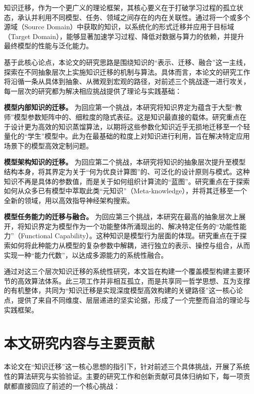 \documentclass[../main.tex]{subfiles}
\begin{document}
知识迁移，作为一个更广义的理论框架，其核心要义在于打破学习过程的孤立状态，承认并利用不同模型、任务、领域之间存在的内在关联性。通过将一个或多个源域（Source Domain）中获取的知识，以系统化的形式迁移并应用于目标域（Target Domain），能够显著加速学习过程、降低对数据与算力的依赖，并提升最终模型的性能与泛化能力。

基于此核心论点，本论文的研究思路是围绕知识的“表示、迁移、融合”这一主线，探索在不同抽象层次上实施知识迁移的机制与算法。具体而言，本论文的研究工作将沿循一条从具体到抽象、从微观到宏观的路径，对前述三个挑战逐一进行攻关，每一层次的研究都为解决相应挑战提供了理论与实践基础：

\textbf{ 模型内部知识的迁移。} 为回应第一个挑战，本研究将知识界定为蕴含于大型“教师”模型参数矩阵中的、细粒度的隐式表征。这是知识最直接的载体。研究重点在于设计更为高效的知识蒸馏算法，以期将这些参数化知识近乎无损地迁移至一个轻量化的“学生”模型中。此为在最基础的粒度上对知识进行利用，旨在解决特定应用场景下的模型高效定制问题。

\textbf{ 模型架构知识的迁移。} 为回应第二个挑战，本研究将知识的抽象层次提升至模型结构本身，将其界定为关于“何为优良计算图”的、可泛化的设计原则与模式。这种知识不再是具体的参数值，而是关于如何组织计算流的“蓝图”。研究重点在于探索如何从众多已有模型中萃取此类“元知识”（Meta-knowledge），并将其迁移至一个全新的领域，用以高效指导神经架构搜索。

\textbf{ 模型任务能力的迁移与融合。} 为回应第三个挑战，本研究在最高的抽象层次上展开，将知识界定为模型作为一个功能整体所涌现出的、解决特定任务的“功能性能力”（Functional Capability）。这种知识是模型行为层面的体现。研究重点在于探索如何将此种能力从模型的复杂参数中解耦，进行独立的表示、操控与组合，从而实现一种“能力代数”，以达成多源能力的系统性融合。

通过对这三个层次知识迁移的系统性研究，本文旨在构建一个覆盖模型构建主要环节的高效算法体系。此三项工作并非相互孤立，而是共享同一哲学思想、互为支撑的有机整体，共同为“知识迁移是实现深度模型高效构建的关键路径”这一核心论点，提供了来自不同维度、层层递进的坚实论据，形成了一个完整而自洽的理论与实践框架。

\section[\hspace{-2pt}本文研究内容与主要贡献]{{\heiti{} \hspace{-8pt}本文研究内容与主要贡献}}\label{sec:research-content-and-contribution}

本论文在“知识迁移”这一核心思想的指引下，针对前述三个具体挑战，开展了系统性的算法研究与实验验证。主要的研究工作和创新贡献可具体归纳如下，每一项贡献都直接回应了前述的一个核心挑战：
\end{document}
